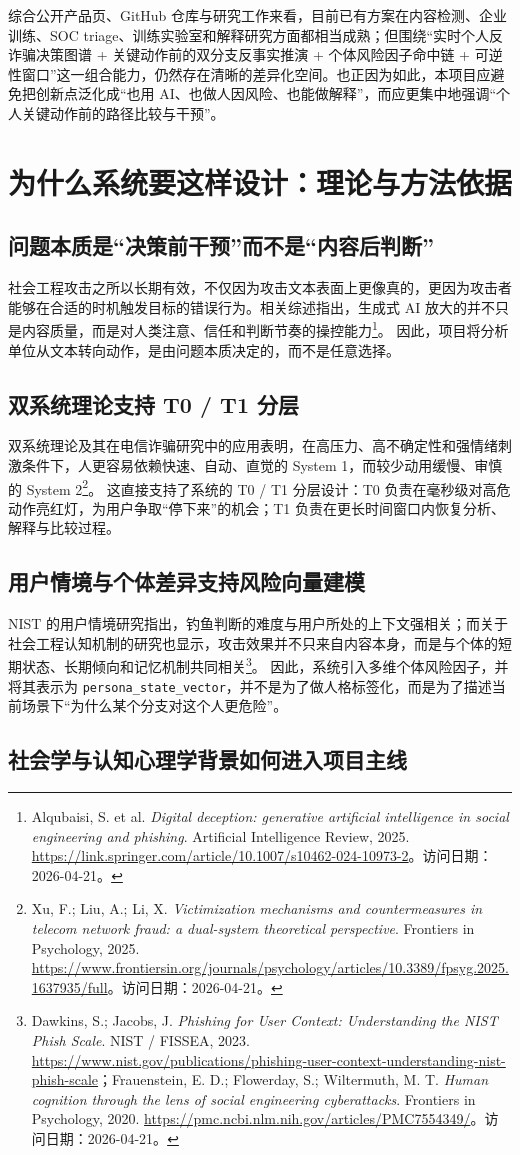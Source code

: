 \documentclass[12pt,a4paper]{ctexart}
\newcommand{\ResearchDate}{2026-04-21}
\newcommand{\SrcDualSystem}{\footnote{Xu, F.; Liu, A.; Li, X. \emph{Victimization mechanisms and countermeasures in telecom network fraud: a dual-system theoretical perspective}. Frontiers in Psychology, 2025. \url{https://www.frontiersin.org/journals/psychology/articles/10.3389/fpsyg.2025.1637935/full}。访问日期：\ResearchDate。}}
\newcommand{\SrcUserContext}{\footnote{Dawkins, S.; Jacobs, J. \emph{Phishing for User Context: Understanding the NIST Phish Scale}. NIST / FISSEA, 2023. \url{https://www.nist.gov/publications/phishing-user-context-understanding-nist-phish-scale}；Frauenstein, E. D.; Flowerday, S.; Wiltermuth, M. T. \emph{Human cognition through the lens of social engineering cyberattacks}. Frontiers in Psychology, 2020. \url{https://pmc.ncbi.nlm.nih.gov/articles/PMC7554349/}。访问日期：\ResearchDate。}}
\newcommand{\SrcDigitalDeception}{\footnote{Alqubaisi, S. et al. \emph{Digital deception: generative artificial intelligence in social engineering and phishing}. Artificial Intelligence Review, 2025. \url{https://link.springer.com/article/10.1007/s10462-024-10973-2}。访问日期：\ResearchDate。}}
\begin{document}
综合公开产品页、GitHub 仓库与研究工作来看，目前已有方案在内容检测、企业训练、SOC triage、训练实验室和解释研究方面都相当成熟；但围绕“实时个人反诈骗决策图谱 + 关键动作前的双分支反事实推演 + 个体风险因子命中链 + 可逆性窗口”这一组合能力，仍然存在清晰的差异化空间。也正因为如此，本项目应避免把创新点泛化成“也用 AI、也做人因风险、也能做解释”，而应更集中地强调“个人关键动作前的路径比较与干预”。

\section{为什么系统要这样设计：理论与方法依据}

\subsection{问题本质是“决策前干预”而不是“内容后判断”}

社会工程攻击之所以长期有效，不仅因为攻击文本表面上更像真的，更因为攻击者能够在合适的时机触发目标的错误行为。相关综述指出，生成式 AI 放大的并不只是内容质量，而是对人类注意、信任和判断节奏的操控能力\SrcDigitalDeception。 因此，项目将分析单位从文本转向动作，是由问题本质决定的，而不是任意选择。

\subsection{双系统理论支持 T0 / T1 分层}

双系统理论及其在电信诈骗研究中的应用表明，在高压力、高不确定性和强情绪刺激条件下，人更容易依赖快速、自动、直觉的 System 1，而较少动用缓慢、审慎的 System 2\SrcDualSystem。 这直接支持了系统的 T0 / T1 分层设计：T0 负责在毫秒级对高危动作亮红灯，为用户争取“停下来”的机会；T1 负责在更长时间窗口内恢复分析、解释与比较过程。

\subsection{用户情境与个体差异支持风险向量建模}

NIST 的用户情境研究指出，钓鱼判断的难度与用户所处的上下文强相关；而关于社会工程认知机制的研究也显示，攻击效果并不只来自内容本身，而是与个体的短期状态、长期倾向和记忆机制共同相关\SrcUserContext。 因此，系统引入多维个体风险因子，并将其表示为 \texttt{persona\_state\_vector}，并不是为了做人格标签化，而是为了描述当前场景下“为什么某个分支对这个人更危险”。

\subsection{社会学与认知心理学背景如何进入项目主线}
\end{document}
